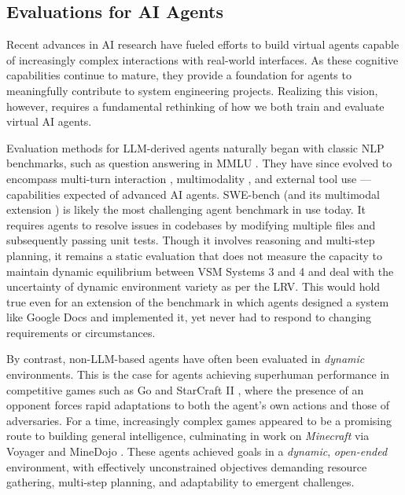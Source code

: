 \subsection{Evaluations for AI Agents}
Recent advances in AI research have fueled efforts to build virtual agents capable of increasingly complex interactions with real-world interfaces. As these cognitive capabilities continue to mature, they provide a foundation for agents to meaningfully contribute to system engineering projects. Realizing this vision, however, requires a fundamental rethinking of how we both train and evaluate virtual AI agents.

Evaluation methods for LLM-derived agents naturally began with classic NLP benchmarks, such as question answering in MMLU \cite{hendrycks2021mmlu}. They have since evolved to encompass multi-turn interaction \cite{zheng2023mtbench}, multimodality \cite{yue2024mmmu}, and external tool use \cite{zhou2023agentbench, he2024webvoyager}—capabilities expected of advanced AI agents. SWE-bench \cite{jimenez2024swebench} (and its multimodal extension \cite{yang2024swebenchmultimodalaisystems}) is likely the most challenging agent benchmark in use today. It requires agents to resolve issues in codebases by modifying multiple files and subsequently passing unit tests. Though it involves reasoning and multi-step planning, it remains a static evaluation that does not measure the capacity to maintain dynamic equilibrium between VSM Systems 3 and 4 and deal with the uncertainty of dynamic environment variety as per the LRV. This would hold true even for an extension of the benchmark in which agents designed a system like Google Docs and implemented it, yet never had to respond to changing requirements or circumstances.

By contrast, non-LLM-based agents have often been evaluated in \emph{dynamic} environments. This is the case for agents achieving superhuman performance in competitive games such as Go \cite{silver2017alphazero} and StarCraft II \cite{vinyals2019alphastar}, where the presence of an opponent forces rapid adaptations to both the agent’s own actions and those of adversaries. For a time, increasingly complex games appeared to be a promising route to building general intelligence, culminating in work on \textit{Minecraft} via Voyager \cite{wang2023voyager} and MineDojo \cite{fan2022minedojo}. These agents achieved goals in a \emph{dynamic}, \emph{open-ended} environment, with effectively unconstrained objectives demanding resource gathering, multi-step planning, and adaptability to emergent challenges. 


